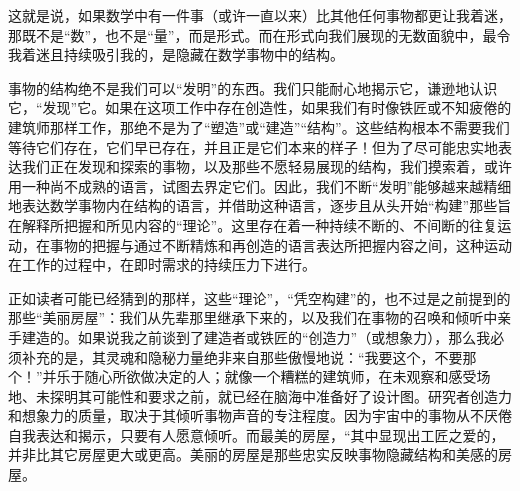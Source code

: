 这就是说，如果数学中有一件事（或许一直以来）比其他任何事物都更让我着迷，那既不是“数”，也不是“量”，而是形式。而在形式向我们展现的无数面貌中，最令我着迷且持续吸引我的，是隐藏在数学事物中的结构。

事物的结构绝不是我们可以“发明”的东西。我们只能耐心地揭示它，谦逊地认识它，“发现”它。如果在这项工作中存在创造性，如果我们有时像铁匠或不知疲倦的建筑师那样工作，那绝不是为了“塑造”或“建造”“结构”。这些结构根本不需要我们等待它们存在，它们早已存在，并且正是它们本来的样子！但为了尽可能忠实地表达我们正在发现和探索的事物，以及那些不愿轻易展现的结构，我们摸索着，或许用一种尚不成熟的语言，试图去界定它们。因此，我们不断“发明”能够越来越精细地表达数学事物内在结构的语言，并借助这种语言，逐步且从头开始“构建”那些旨在解释所把握和所见内容的“理论”。这里存在着一种持续不断的、不间断的往复运动，在事物的把握与通过不断精炼和再创造的语言表达所把握内容之间，这种运动在工作的过程中，在即时需求的持续压力下进行。

正如读者可能已经猜到的那样，这些“理论”，“凭空构建”的，也不过是之前提到的那些“美丽房屋”：我们从先辈那里继承下来的，以及我们在事物的召唤和倾听中亲手建造的。如果说我之前谈到了建造者或铁匠的“创造力”（或想象力），那么我必须补充的是，其灵魂和隐秘力量绝非来自那些傲慢地说：“我要这个，不要那个！”并乐于随心所欲做决定的人；就像一个糟糕的建筑师，在未观察和感受场地、未探明其可能性和要求之前，就已经在脑海中准备好了设计图。研究者创造力和想象力的质量，取决于其倾听事物声音的专注程度。因为宇宙中的事物从不厌倦自我表达和揭示，只要有人愿意倾听。而最美的房屋，“其中显现出工匠之爱的，并非比其它房屋更大或更高。美丽的房屋是那些忠实反映事物隐藏结构和美感的房屋。